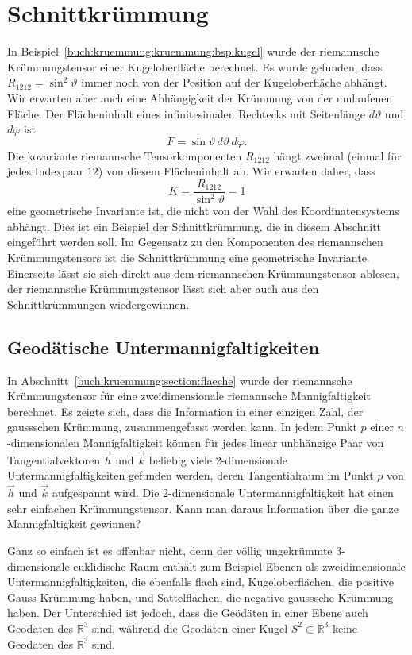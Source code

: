 %
%
\section{Schnittkrümmung
\label{buch:kruemmung:section:schnittkruemmung}}
In Beispiel~\ref{buch:kruemmung:kruemmung:bsp:kugel} wurde der 
riemannsche Krümmungstensor einer Kugeloberfläche berechnet.
Es wurde gefunden, dass $R_{1212}=\sin^2\vartheta$ immer noch von der 
Position auf der Kugeloberfläche abhängt.
Wir erwarten aber auch eine Abhängigkeit der Krümmung von der umlaufenen
Fläche.
Der Flächeninhalt eines infinitesimalen Rechtecks mit Seitenlänge
$d\vartheta$ und $d\varphi$ ist
\[
F
=
\sin\vartheta\, d\vartheta\,d\varphi.
\]
Die kovariante riemannsche Tensorkomponenten $R_{1212}$ hängt zweimal
(einmal für jedes Indexpaar $12$) von diesem Flächeninhalt ab.
Wir erwarten daher, dass
\[
K
=
\frac{R_{1212}}{\sin^2\vartheta}
=
1
\]
eine geometrische Invariante ist, die nicht von der Wahl des
Koordinatensystems abhängt.
Dies ist ein Beispiel der Schnittkrümmung, die in diesem Abschnitt
eingeführt werden soll.
Im Gegensatz zu den Komponenten des riemannschen Krümmungstensors ist
die Schnittkrümmung eine geometrische Invariante.
Einerseits lässt sie sich direkt aus dem riemannschen Krümmungstensor
ablesen, der riemannsche Krümmungstensor lässt sich aber auch aus
den Schnittkrümmungen wiedergewinnen.

%
%
\subsection{Geodätische Untermannigfaltigkeiten
\label{buch:kruemmung:schnittkrüemmung:subsection:geodum}}
In Abschnitt~\ref{buch:kruemmung:section:flaeche} wurde der
riemannsche Krümmungstensor für eine zweidimensionale riemannsche
Mannigfaltigkeit berechnet.
Es zeigte sich, dass die Information in einer einzigen Zahl,
der gaussschen Krümmung, zusammengefasst werden kann.
In jedem Punkt $p$ einer $n$-dimensionalen Mannigfaltigkeit können für
jedes linear unbhängige Paar von Tangentialvektoren $\vec{h}$ und $\vec{k}$
beliebig viele 2-dimensionale Untermannigfaltigkeiten gefunden werden,
deren Tangentialraum im Punkt $p$ von $\vec{h}$ und $\vec{k}$ aufgespannt
wird.
Die 2-dimensionale Untermannigfaltigkeit hat einen sehr einfachen
Krümmungstensor.
Kann man daraus Information über die ganze Mannigfaltigkeit gewinnen?

Ganz so einfach ist es offenbar nicht, denn der völlig ungekrümmte
3-dimensionale euklidische Raum enthält zum Beispiel Ebenen als
zweidimensionale Untermannigfaltigkeiten, die ebenfalls flach sind,
Kugeloberflächen, die positive Gauss-Krümmung haben, und
Sattelflächen, die negative gausssche Krümmung haben.
Der Unterschied ist jedoch, dass die Geödäten in einer Ebene auch
Geodäten des $\mathbb{R}^3$ sind, während die Geodäten einer 
Kugel $S^2\subset\mathbb{R}^3$ keine Geodäten des $\mathbb{R}^3$
sind.

